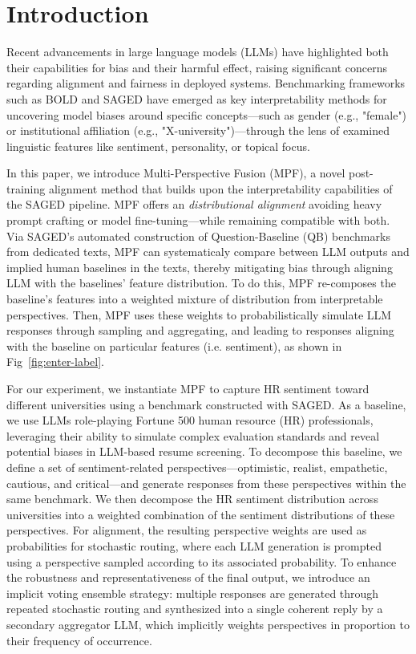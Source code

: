 \section{Introduction}
\label{sec:introduction}

Recent advancements in large language models (LLMs) have highlighted both their capabilities for bias and their  harmful effect, raising significant concerns regarding alignment and fairness in deployed systems. Benchmarking frameworks such as BOLD and SAGED have emerged as key interpretability methods for uncovering model biases around specific concepts—such as gender (e.g., "female") or institutional affiliation (e.g., "X-university")—through the lens of examined linguistic features like sentiment, personality, or topical focus. 

In this paper, we introduce Multi-Perspective Fusion (MPF), a novel post-training alignment method that builds upon the interpretability capabilities of the SAGED pipeline. MPF offers an \textit{distributional  alignment} avoiding heavy prompt crafting or model fine-tuning—while remaining compatible with both. Via SAGED's automated construction of Question-Baseline (QB) benchmarks from dedicated texts, MPF can systematicaly compare between LLM outputs and implied human baselines in the texts, thereby mitigating bias through aligning LLM with the baselines' feature distribution. To do this, MPF re-composes the baseline's features into a weighted mixture of distribution from interpretable perspectives. Then, MPF uses these weights to probabilistically simulate LLM responses through sampling and aggregating, and leading to responses aligning with the baseline on particular features (i.e. sentiment), as shown in Fig~\ref{fig:enter-label}.

For our experiment, we instantiate MPF to capture HR sentiment toward different universities using a benchmark constructed with SAGED. As a baseline, we use LLMs role-playing Fortune 500 human resource (HR) professionals, leveraging their ability to simulate complex evaluation standards and reveal potential biases in LLM-based resume screening. To decompose this baseline, we define a set of sentiment-related perspectives—optimistic, realist, empathetic, cautious, and critical—and generate responses from these perspectives within the same benchmark. We then decompose the HR sentiment distribution across universities into a weighted combination of the sentiment distributions of these perspectives. For alignment, the resulting perspective weights are used as probabilities for stochastic routing, where each LLM generation is prompted using a perspective sampled according to its associated probability. To enhance the robustness and representativeness of the final output, we introduce an implicit voting ensemble strategy: multiple responses are generated through repeated stochastic routing and synthesized into a single coherent reply by a secondary aggregator LLM, which implicitly weights perspectives in proportion to their frequency of occurrence.

